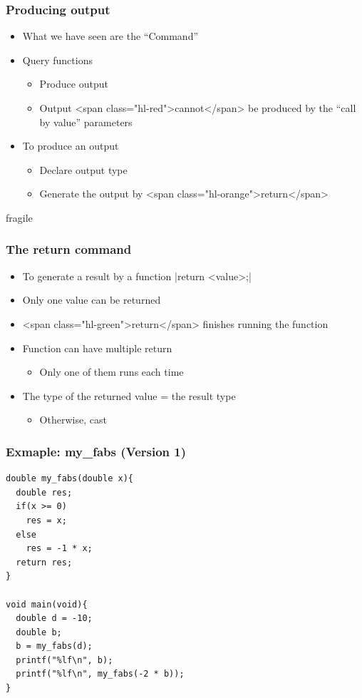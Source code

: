 \documentclass{../c-lecture}
\begin{document}
\begin{frame}
  \frametitle{Producing output}
  \begin{itemize}
    \item What we have seen are the “Command”
    \item Query functions
    \begin{itemize}
      \item Produce output
      \item
        Output <span class="hl-red">cannot</span> be produced by the “call by
        value” parameters

    \end{itemize}
    \item To produce an output
    \begin{itemize}
      \item Declare output type
      \item Generate the output by <span class="hl-orange">return</span>
    \end{itemize}
  \end{itemize}
\end{frame}

\begin{frame}{fragile}
  \frametitle{The return command}
  \begin{itemize}
    \item To generate a result by a function
    |return <value>;|
    \item Only one value can be returned
    \item <span class="hl-green">return</span> finishes running the function
    \item Function can have multiple return
    \begin{itemize}
      \item Only one of them runs each time
    \end{itemize}
    \item The type of the returned value = the result type
    \begin{itemize}
      \item Otherwise, cast
    \end{itemize}
  \end{itemize}
\end{frame}

\begin{frame}
  \frametitle{Exmaple: my_fabs (Version 1)}
  \begin{verbatim}
double my_fabs(double x){
  double res;
  if(x >= 0)
    res = x;
  else
    res = -1 * x;
  return res;
}

void main(void){
  double d = -10;
  double b;
  b = my_fabs(d);
  printf("%lf\n", b);
  printf("%lf\n", my_fabs(-2 * b));
}
  \end{verbatim}
\end{frame}
\end{document}
